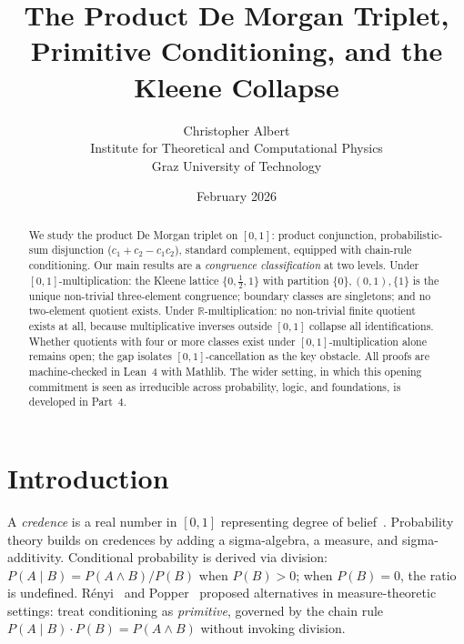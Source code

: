 \documentclass[11pt,a4paper]{article}
\title{The Product De Morgan Triplet, Primitive Conditioning, and the Kleene Collapse}
\author{Christopher Albert\\
\small Institute for Theoretical and Computational Physics\\
\small Graz University of Technology}
\date{February 2026}
\begin{document}
\maketitle

\begin{abstract}
We study the product De Morgan triplet on $[0,1]$: product conjunction,
probabilistic-sum disjunction ($c_1 + c_2 - c_1 c_2$), standard
complement, equipped with chain-rule conditioning.
Our main results are a \emph{congruence classification} at two levels.
Under $[0,1]$-multiplication:
the Kleene lattice $\{0,\tfrac{1}{2},1\}$ with partition
$\{0\},(0,1),\{1\}$ is the unique non-trivial three-element congruence;
boundary classes are singletons; and no two-element quotient exists.
Under $\mathbb{R}$-multiplication:
no non-trivial finite quotient exists at all, because multiplicative
inverses outside $[0,1]$ collapse all identifications.
Whether quotients with four or more classes exist under
$[0,1]$-multiplication alone remains open; the gap isolates
$[0,1]$-cancellation as the key obstacle.
All proofs are machine-checked in Lean~4 with Mathlib.
The wider setting, in which this opening commitment is seen as irreducible across probability, logic, and foundations, is developed in Part~4.
\end{abstract}

\section{Introduction}
\label{sec:intro}

A \emph{credence} is a real number in $[0,1]$ representing degree of
belief~\cite{ramsey1931,definetti1937,jaynes2003}.
Probability theory builds on credences by adding a sigma-algebra, a measure,
and sigma-additivity.
Conditional probability is derived via division:
$P(A \mid B) = P(A \land B)/P(B)$ when $P(B) > 0$; when $P(B) = 0$, the
ratio is undefined.
R\'enyi~\cite{renyi1955} and Popper~\cite{popper1959} proposed
alternatives in measure-theoretic settings: treat conditioning as
\emph{primitive}, governed by the chain rule
$P(A \mid B) \cdot P(B) = P(A \land B)$ without invoking division.
\end{document}
